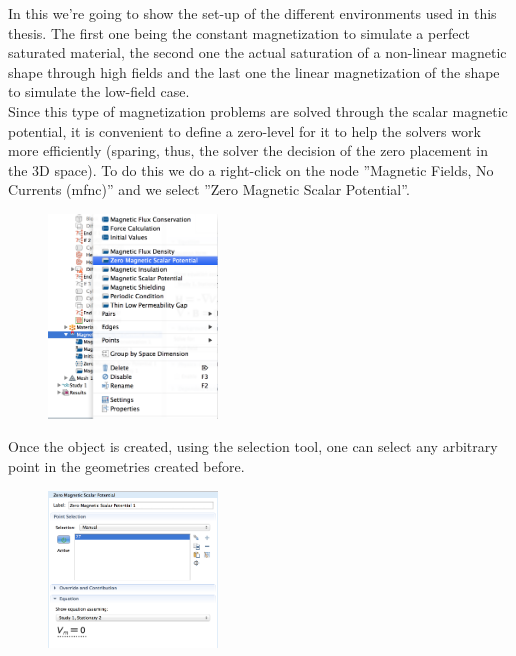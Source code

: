 In this we're going to show the set-up of the different environments used in this thesis. The first one being the constant magnetization to simulate a perfect saturated material, the second one the actual saturation of a non-linear magnetic shape through high fields and the last one the linear magnetization of the shape to simulate the low-field case.\\

Since this type of magnetization problems are solved through the scalar magnetic potential, it is convenient to define a zero-level for it to help the solvers work more efficiently (sparing, thus, the solver the decision of the zero placement in the 3D space). To do this we do a right-click on the node ''Magnetic Fields, No Currents (mfnc)'' and we select ''Zero Magnetic Scalar Potential''.\\

\begin{figure}[H]
	\centering
  \includegraphics[width=0.4\textwidth]{Pictures/Screenshots/Sim7.png}
\end{figure}

Once the object is created, using the selection tool, one can select any arbitrary point in the geometries created before.

\begin{figure}[H]
	\centering
  \includegraphics[width=0.4\textwidth]{Pictures/Screenshots/Sim9.png}
\end{figure}

